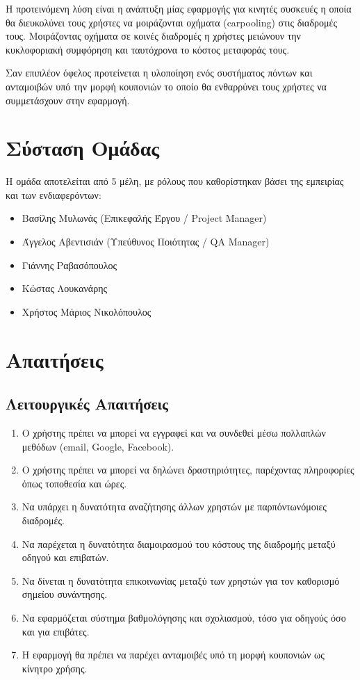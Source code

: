 Η προτεινόμενη λύση είναι η ανάπτυξη μίας εφαρμογής για κινητές συσκευές
η οποία θα διευκολύνει τους χρήστες να μοιράζονται οχήματα (carpooling) στις
διαδρομές τους. Μοιράζοντας οχήματα σε κοινές διαδρομές η χρήστες μειώνουν
την κυκλοφοριακή συμφόρηση και ταυτόχρονα το κόστος μεταφοράς τους.

Σαν επιπλέον όφελος προτείνεται η υλοποίηση ενός συστήματος πόντων και ανταμοιβών
υπό την μορφή κουπονιών το οποίο θα ενθαρρύνει τους χρήστες να συμμετάσχουν
στην εφαρμογή.

\newpage

\section{Σύσταση Ομάδας}
Η ομάδα αποτελείται από 5 μέλη, με ρόλους που καθορίστηκαν βάσει της εμπειρίας και των ενδιαφερόντων:
\begin{itemize}
    \item Βασίλης Μυλωνάς (Επικεφαλής Έργου / Project Manager)
    \item Άγγελος Αβεντισιάν (Υπεύθυνος Ποιότητας / QA Manager)
    \item Γιάννης Ραβασόπουλος
    \item Κώστας Λουκανάρης
    \item Χρήστος Μάριος Νικολόπουλος
\end{itemize}

\newpage

\section{Απαιτήσεις}

\subsection{Λειτουργικές Απαιτήσεις}

\begin{enumerate}
    \item Ο χρήστης πρέπει να μπορεί να εγγραφεί και να συνδεθεί μέσω πολλαπλών μεθόδων (email, Google, Facebook).
    \item Ο χρήστης πρέπει να μπορεί να δηλώνει δραστηριότητες, παρέχοντας πληροφορίες όπως τοποθεσία και ώρες.
    \item Να υπάρχει η δυνατότητα αναζήτησης άλλων χρηστών με παρπόντωνόμοιες διαδρομές.
    \item Να παρέχεται η δυνατότητα διαμοιρασμού του κόστους της διαδρομής μεταξύ οδηγού και επιβατών.
    \item Να δίνεται η δυνατότητα επικοινωνίας μεταξύ των χρηστών για τον καθορισμό σημείου συνάντησης.
    \item Να εφαρμόζεται σύστημα βαθμολόγησης και σχολιασμού, τόσο για οδηγούς όσο και για επιβάτες.
    \item Η εφαρμογή θα πρέπει να παρέχει ανταμοιβές υπό τη μορφή κουπονιών ως κίνητρο χρήσης.
\end{enumerate}

